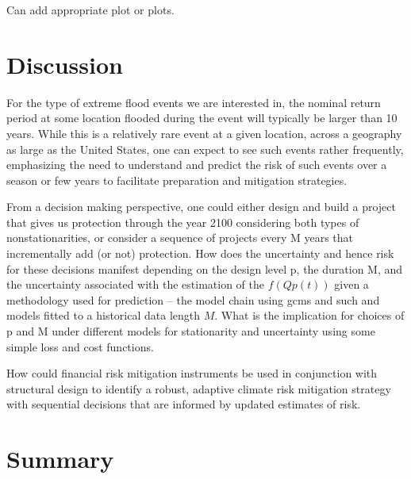 \documentclass[12pt]{article}
\begin{document}
Can add appropriate plot or plots.

\section{Discussion}

For the type of extreme flood events we are interested in, the nominal return period at some location flooded during the event will typically be larger than 10 years.
While this is a relatively rare event at a given location, across a geography as large as the United States, one can expect to see such events rather frequently, emphasizing the need to understand and predict the risk of such events over a season or few years to facilitate preparation and mitigation strategies.

From a decision making perspective, one could either design and build a project that gives us protection through the year 2100 considering both types of nonstationarities, or consider a sequence of projects every M years that incrementally add (or not) protection. How does the uncertainty and hence risk for these decisions manifest depending on the design level p, the duration M, and the uncertainty associated with the estimation of the \( f(Qp(t)) \) given a methodology used for prediction -- \eg{} the model chain using gcms and such and models fitted to a historical data length \(M\).
What is the implication for choices of p and M under different models for stationarity and uncertainty using some simple loss and cost  functions.

How could  financial risk mitigation instruments be used in conjunction with structural design to identify a robust, adaptive climate risk mitigation strategy with sequential decisions that are informed by updated estimates of risk.


\section{Summary}
\end{document}
